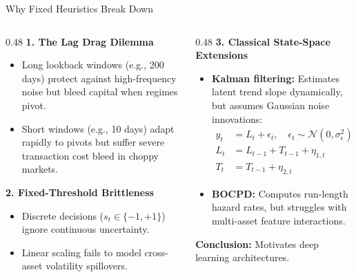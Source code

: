 \documentclass[10pt]{beamer}
\begin{document}
\begin{frame}{Why Fixed Heuristics Break Down}
  \begin{columns}[t]
    \begin{column}{0.48\textwidth}
      \textbf{1. The Lag Drag Dilemma}
      \begin{itemize}\scriptsize
        \item Long lookback windows (e.g., 200 days) protect against high-frequency noise but bleed capital when regimes pivot.
        \item Short windows (e.g., 10 days) adapt rapidly to pivots but suffer severe transaction cost bleed in choppy markets.
      \end{itemize}
      \vspace{0.1cm}
      \textbf{2. Fixed-Threshold Brittleness}
      \begin{itemize}\scriptsize
        \item Discrete decisions ($s_t \in \{-1, +1\}$) ignore continuous uncertainty.
        \item Linear scaling fails to model cross-asset volatility spillovers.
      \end{itemize}
    \end{column}
    \begin{column}{0.48\textwidth}
      \textbf{3. Classical State-Space Extensions}
      \begin{itemize}\scriptsize
        \item \textbf{Kalman filtering:} Estimates latent trend slope dynamically, but assumes Gaussian noise innovations:
        \begin{align*}
          y_t &= L_t + \epsilon_t, \quad \epsilon_t \sim \mathcal{N}(0, \sigma_\epsilon^2) \\
          L_t &= L_{t-1} + T_{t-1} + \eta_{1,t} \\
          T_t &= T_{t-1} + \eta_{2,t}
        \end{align*}
        \item \textbf{BOCPD:} Computes run-length hazard rates, but struggles with multi-asset feature interactions.
      \end{itemize}
      \vspace{0.05cm}
      \textbf{Conclusion:} Motivates deep learning architectures.
    \end{column}
  \end{columns}
\end{frame}

\end{document}
